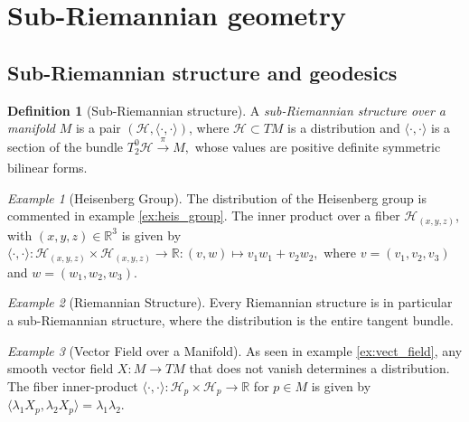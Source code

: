 \documentclass [xcolor=svgnames, t] {beamer}
\theoremstyle{definition}
\newtheorem{df}{Definition}
\theoremstyle{plain}
\theoremstyle{remark}
\newtheorem{ex}{Example}
\begin{document}
\section{Sub-Riemannian geometry}
\subsection{Sub-Riemannian structure and geodesics}
\begin{frame}
	\begin{df}[Sub-Riemannian structure]
	A \textit{sub-Riemannian structure over a manifold} $ M $ is a pair $ (\mathcal{H}, \langle\cdot,\cdot\rangle)$, where $ \mathcal{H}\subset TM $ is a distribution and $ \langle\cdot,\cdot\rangle $ is a section of the bundle $ T^0_2 \mathcal{H} \xrightarrow[]{\pi} M, $ whose values are positive definite symmetric bilinear forms.
\end{df}

\begin{ex}[Heisenberg Group]\label{ex:heis_group2}
	The distribution of the Heisenberg group is commented in example \ref{ex:heis_group}. The inner product over a fiber $ \mathcal{H}_{(x,y,z)} $, with $ (x,y,z)\in \mathbb{R}^3 $  is given by $\langle\cdot,\cdot\rangle:  \mathcal{H}_{(x,y,z)}\times\mathcal{H}_{(x,y,z)} \rightarrow { \mathbb{R} }:(v,w)\mapsto v_1w_1+v_2w_2,$ where $ v=(v_1,v_2,v_3) $ and $ w=(w_1,w_2,w_3). $  

\end{ex}
\begin{ex}[Riemannian Structure]\label{ex:riem_geo2}
	Every Riemannian structure is in particular a sub-Riemannian structure, where the distribution is the entire tangent bundle.
\end{ex}
\begin{ex}[Vector Field over a Manifold]\label{ex:vect_field2}
	As seen in example \ref{ex:vect_field}, any smooth vector field $ X: M \rightarrow TM$ that does not vanish determines a distribution.  The fiber inner-product $ \langle\cdot,\cdot\rangle: \mathcal{H}_p \times \mathcal{H}_p \rightarrow \mathbb{R} $ for $ p\in M $  is given by $\langle\lambda_1 X_p,\lambda_2 X_p\rangle=\lambda_1 \lambda_2.$
\end{ex}


\end{frame}
\end{document}
